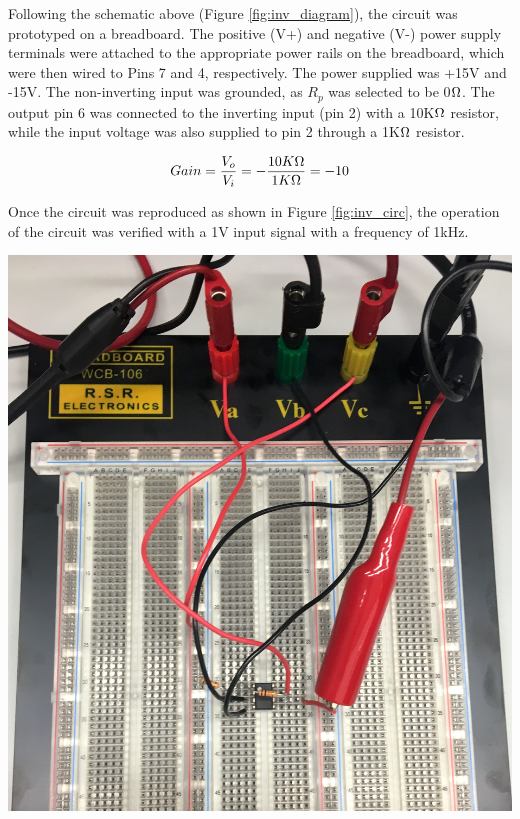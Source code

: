 \documentclass[journal]{IEEEtran}
\begin{document}
\noindent Following the schematic above (Figure \ref{fig:inv_diagram}), the circuit was prototyped on a breadboard. The positive (V+) and negative (V-) power supply terminals were attached to the appropriate power rails on the breadboard, which were then wired to Pins 7 and 4, respectively. The power supplied was +15V and -15V. The non-inverting input was grounded, as $R_p$ was selected to be 0$\ohm$. The output pin 6 was connected to the inverting input (pin 2) with a 10K$\ohm$ resistor, while the input voltage was also supplied to pin 2 through a 1K$\ohm$ resistor.

\begin{equation}
Gain = \frac{V_o}{V_i} = -\frac{10K\ohm}{1K\ohm} = -10
\label{eq:inverting}
\end{equation}


\noindent Once the circuit was reproduced as shown in  Figure \ref{fig:inv_circ}, the operation of the circuit was verified with a 1V input signal with a frequency of 1kHz.

\begingroup
    \centering
    \medskip
    \includegraphics[width=\columnwidth]{images/lab7_inverting_circuit.jpg}
    \label{fig:inv_circ}
    \medskip
\endgroup
\end{document}

